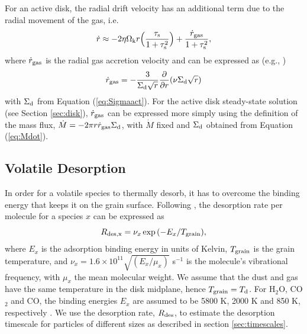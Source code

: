 \documentclass[apj]{emulateapj}
\begin{document}
For an active disk, the radial drift velocity has an additional term due to the radial movement of the gas, i.e.
\begin{equation}
\label{eq:rdotact}
\dot{r} \approx -2 \eta \Omega_{\rm k} r \Big(\frac{\tau_{\rm s}}{1+\tau_{\rm s}^2}\Big) + \frac{\dot{r}_{\rm gas}}{1+\tau_{\rm s}^2},
\end{equation}
where $\dot{r}_{\rm gas}$ is the radial gas accretion velocity and can be expressed as (e.g., \citealt{fkr02})
\begin{equation}
\label{eq:vgas}
\dot{r}_{\rm gas} = - \frac{3}{\Sigma_{\rm d} \sqrt{r}} \frac{\partial}{\partial r}(\nu \Sigma_{\rm d} \sqrt{r}) 
\end{equation}
with $\Sigma_{\rm d}$ from Equation (\ref{eq:Sigmaact}). For the active disk steady-state solution (see Section \ref{sec:disk}), $\dot{r}_{\rm gas}$ can be expressed more simply using the definition of the mass flux, $\dot{M}=-2 \pi r \dot{r}_{\rm gas} \Sigma_{\rm d}$, with $\dot{M}$ fixed and $\Sigma_{\rm d}$ obtained from Equation (\ref{eq:Mdot}). 

\subsection{Volatile Desorption}
\label{sec:desorption}


In order for a volatile species to thermally desorb, it has to overcome the binding energy that keeps it on the grain surface. Following \citet{hollenbach09}, the desorption rate per molecule for a species $x$ can be expressed as
\begin{equation}
\label{eq:Rdes}
R_{\rm{des}, x} = \nu_x \exp{(-E_x/T_{\rm grain})},
\end{equation}
where $E_x$ is the adsorption binding energy in units of Kelvin, $T_{\rm grain}$ is the grain temperature, and $\nu_x=1.6 \times 10^{11} \sqrt{(E_x/\mu_x)}$ s$^{-1}$ is the molecule's vibrational frequency, with $\mu_x$ the mean molecular weight. We assume that the dust and gas have the same temperature in the disk midplane, hence $T_{\rm grain}=T_{\rm d}$. For H$_2$O, CO$_2$ and CO, the binding energies $E_x$ are assumed to be 5800 K, 2000 K and 850 K, respectively \citep{oberg11}. We use the desorption rate, $R_{\rm des}$, to estimate the desorption timescale for particles of different sizes as described in section \ref{sec:timescales}. 
\end{document}
